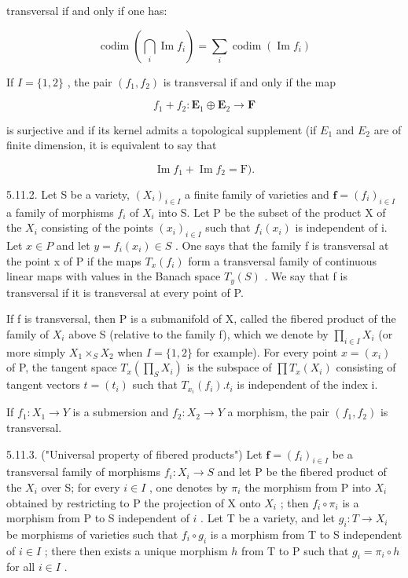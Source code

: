 transversal if and only if one has:

\[
\operatorname{codim} \left(\bigcap_ {i} \operatorname{Im} f _ {i}\right) = \sum_ {i} \operatorname{codim} \left(\operatorname{Im} f _ {i}\right)
\]

If \(I = \{1, 2\}\) , the pair \((f_1, f_2)\) is transversal if and only if the map

\[
f _ {1} + f _ {2}: \mathbf {E} _ {1} \oplus \mathbf {E} _ {2} \rightarrow \mathbf {F}
\]

is surjective and if its kernel admits a topological supplement (if \(E_{1}\) and \(E_{2}\) are of finite dimension, it is equivalent to say that

\[
\operatorname{Im} f _ {1} + \operatorname{Im} f _ {2} = \mathrm{F}).
\]

5.11.2. Let S be a variety, \((X_{i})_{i\in I}\) a finite family of varieties and \(\mathbf{f}=(f_{i})_{i\in I}\) a family of morphisms \(f_{i}\) of \(X_{i}\) into S. Let P be the subset of the product X of the \(X_{i}\) consisting of the points \((x_{i})_{i\in I}\) such that \(f_{i}(x_{i})\) is independent of i. Let \(x\in P\) and let \(y=f_{i}(x_{i})\in S\) . One says that the family f is transversal at the point x of P if the maps \(T_{x}(f_{i})\) form a transversal family of continuous linear maps with values in the Banach space \(T_{y}(S)\) . We say that f is transversal if it is transversal at every point of P.

If f is transversal, then P is a submanifold of X, called the fibered product of the family of \(X_{i}\) above S (relative to the family f), which we denote by \(\prod_{i\in I}X_{i}\) (or more simply \(X_{1}\times_{S}X_{2}\) when \(I=\{1,2\}\) for example). For every point \(x=(x_{i})\) of P, the tangent space \(T_{x}(\prod_{S}X_{i})\) is the subspace of \(\prod T_{x}(X_{i})\) consisting of tangent vectors \(t=(t_{i})\) such that \(T_{x_{i}}(f_{i}).t_{i}\) is independent of the index i.

If \(f_{1}: X_{1} \to Y\) is a submersion and \(f_{2}: X_{2} \to Y\) a morphism, the pair \((f_{1}, f_{2})\) is transversal.

5.11.3. ("Universal property of fibered products") Let \(\mathbf{f} = (f_i)_{i \in I}\) be a transversal family of morphisms \(f_i: X_i \to S\) and let P be the fibered product of the \(X_i\) over S; for every \(i \in I\) , one denotes by \(\pi_i\) the morphism from P into \(X_i\) obtained by restricting to P the projection of X onto \(X_i\) ; then \(f_i \circ \pi_i\) is a morphism from P to S independent of \(i\) . Let T be a variety, and let \(g_i: T \to X_i\) be morphisms of varieties such that \(f_i \circ g_i\) is a morphism from T to S independent of \(i \in I\) ; there then exists a unique morphism \(h\) from T to P such that \(g_i = \pi_i \circ h\) for all \(i \in I\) .


